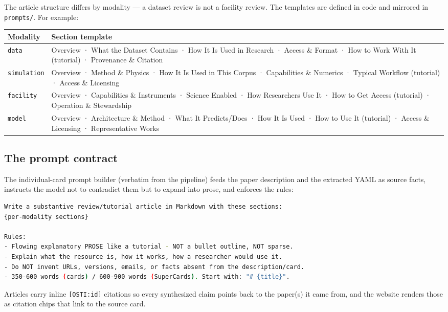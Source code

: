 \documentclass[11pt,letterpaper]{article}
\newcommand{\code}[1]{\texttt{\small #1}}
\begin{document}
The article structure differs by modality --- a dataset review is not a facility
review. The templates are defined in code and mirrored in \code{prompts/}. For
example:

\begin{center}
\small
\begin{tabular}{@{}l p{9.2cm}@{}}
\toprule
\textbf{Modality} & \textbf{Section template} \\
\midrule
\code{data} & Overview · What the Dataset Contains · How It Is Used in Research ·
  Access \& Format · How to Work With It (tutorial) · Provenance \& Citation \\
\code{simulation} & Overview · Method \& Physics · How It Is Used in This Corpus ·
  Capabilities \& Numerics · Typical Workflow (tutorial) · Access \& Licensing \\
\code{facility} & Overview · Capabilities \& Instruments · Science Enabled ·
  How Researchers Use It · How to Get Access (tutorial) · Operation \& Stewardship \\
\code{model} & Overview · Architecture \& Method · What It Predicts/Does ·
  How It Is Used · How to Use It (tutorial) · Access \& Licensing · Representative Works \\
\bottomrule
\end{tabular}
\end{center}

\subsection{The prompt contract}

The individual-card prompt builder (verbatim from the pipeline) feeds the paper
description and the extracted YAML as source facts, instructs the model not to
contradict them but to expand into prose, and enforces the rules:

\begin{lstlisting}[language=bash]
Write a substantive review/tutorial article in Markdown with these sections:
{per-modality sections}

Rules:
- Flowing explanatory PROSE like a tutorial - NOT a bullet outline, NOT sparse.
- Explain what the resource is, how it works, how a researcher would use it.
- Do NOT invent URLs, versions, emails, or facts absent from the description/card.
- 350-600 words (cards) / 600-900 words (SuperCards). Start with: "# {title}".
\end{lstlisting}

Articles carry inline \code{[OSTI:id]} citations so every synthesized claim points
back to the paper(s) it came from, and the website renders those as citation chips
that link to the source card.
\end{document}
